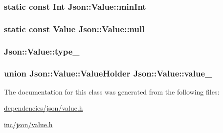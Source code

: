 \hypertarget{classJson_1_1Value_ad062d227e00408ce594026959d6ed2e1}{
\subsubsection[{min\-Int}]{\setlength{\rightskip}{0pt plus 5cm}static const {\bf Int} Json\-::\-Value\-::min\-Int\hspace{0.3cm}{\ttfamily [static]}}}\label{d1/db8/classJson_1_1Value_ad062d227e00408ce594026959d6ed2e1}
\hypertarget{classJson_1_1Value_aee9d0333219166ddecdb9711a0084f1c}{
\subsubsection[{null}]{\setlength{\rightskip}{0pt plus 5cm}static const {\bf Value} Json\-::\-Value\-::null\hspace{0.3cm}{\ttfamily [static]}}}\label{d1/db8/classJson_1_1Value_aee9d0333219166ddecdb9711a0084f1c}
\hypertarget{classJson_1_1Value_abd222c2536dc88bf330dedcd076d2356}{
\subsubsection[{type\-\_\-}]{ Json\-::\-Value\-::type\-\_\-\hspace{0.3cm}{\ttfamily [private]}}}\label{d1/db8/classJson_1_1Value_abd222c2536dc88bf330dedcd076d2356}
\hypertarget{classJson_1_1Value_a692277d820a4750e01354e16a465ecfe}{
\subsubsection[{value\-\_\-}]{\setlength{\rightskip}{0pt plus 5cm}union {\bf Json\-::\-Value\-::\-Value\-Holder} Json\-::\-Value\-::value\-\_\-\hspace{0.3cm}{\ttfamily [private]}}}\label{d1/db8/classJson_1_1Value_a692277d820a4750e01354e16a465ecfe}


The documentation for this class was generated from the following files\-:\begin{DoxyCompactItemize}
\item 
\hyperlink{dependencies_2json_2value_8h}{dependencies/json/value.\-h}\item 
\hyperlink{inc_2json_2value_8h}{inc/json/value.\-h}\end{DoxyCompactItemize}
